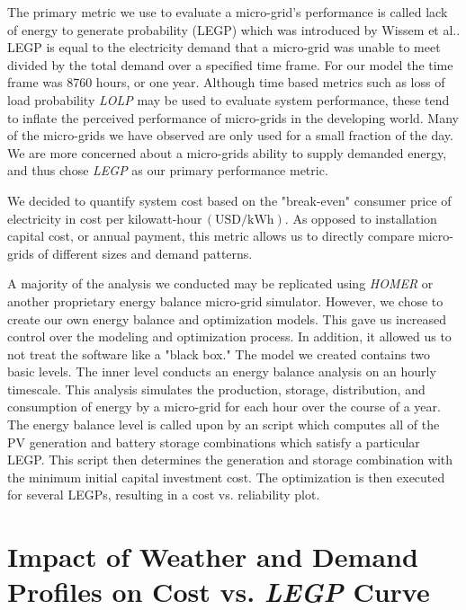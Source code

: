 \documentclass{article}
\newcommand{\unit}[1]{\ensuremath{\, \mathrm{#1}}}
\begin{document}
The primary metric we use to evaluate a micro-grid's performance is called lack of energy to generate probability (LEGP) which was introduced by Wissem et al.\cite{}.
LEGP is equal to the electricity demand that a micro-grid was unable to meet divided by the total demand over a specified time frame.
For our model the time frame was 8760 hours, or one year.
Although time based metrics such as loss of load probability \emph{LOLP} may be used to evaluate system performance, these tend to inflate the perceived performance of micro-grids in the developing world.
Many of the micro-grids we have observed are only used for a small fraction of the day.
We are more concerned about a micro-grids ability to supply demanded energy, and thus chose \emph{LEGP} as our primary performance metric.

We decided to quantify system cost based on the "break-even" consumer price of electricity in cost per kilowatt-hour\unit{(USD/kWh)}.
As opposed to installation capital cost, or annual payment, this metric allows us to directly compare micro-grids of different sizes and demand patterns.



A majority of the analysis we conducted may be replicated using \emph{HOMER} or another proprietary energy balance micro-grid simulator.
However, we chose to create our own energy balance and optimization models.
This gave us increased control over the modeling and optimization process.
In addition, it allowed us to not treat the software like a "black box."
The model we created contains two basic levels.
The inner level conducts an energy balance analysis on an hourly timescale.
This analysis simulates the production, storage, distribution, and consumption of energy by a micro-grid for each hour over the course of a year.
The energy balance level is called upon by an script which computes all of the PV generation and battery storage combinations which satisfy a particular LEGP.
This script then determines the generation and storage combination with the minimum initial capital investment cost.
The optimization is then executed for several LEGPs, resulting in a cost vs. reliability plot.


\section{Impact of Weather and Demand Profiles on Cost vs. \emph{LEGP} Curve}
\end{document}
